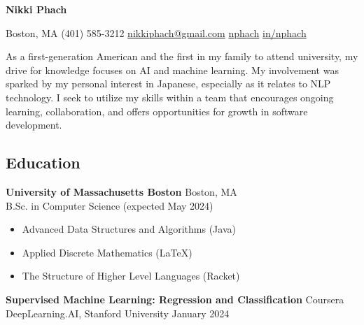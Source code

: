 \documentclass[11pt, letterpaper]{article}
\begin{document}
\begin{center}
    {\huge \textbf{Nikki Phach}}
    \vspace{5mm}
    
    \begin{footnotesize}
    \mbox{} \xdotfill[.5ex]{.4pt} \enspace
    {\color{accent} }
    \enspace Boston, MA \quad\textbar\quad
    {\color{accent} }
    \enspace (401) 585-3212 \quad\textbar\quad
    \href{mailto:nikkiphach@gmail.com}{{\color{accent} } \enspace nikkiphach@gmail.com} \quad\textbar\quad
    \href{https://github.com/nphach}{{\color{accent} } \enspace nphach}
    \quad\textbar\quad
    \href{https://www.linkedin.com/in/nikki-phach-a269172aa/}{{\color{accent} } \enspace in/nphach}
    \enspace \xdotfill[.5ex]{.4pt}
    \end{footnotesize}
    
\end{center}

    \noindent As a first-generation American and the first in my family to attend university, my drive for knowledge focuses on AI and machine learning. My involvement was sparked by my personal interest in Japanese, especially as it relates to NLP technology. I seek to utilize my skills within a team that encourages ongoing learning, collaboration, and offers opportunities for growth in software development.

\vspace{-3mm}
\subsection*{\color{accent} Education \xdotfill[.5ex]{.4pt}}
\textbf{University of Massachusetts Boston} \hfill Boston, MA \\
B.Sc. in Computer Science \hfill (expected May 2024)
\begin{itemize}[noitemsep]
\item Advanced Data Structures and Algorithms (Java)
\item Applied Discrete Mathematics (\LaTeX)
\item The Structure of Higher Level Languages (Racket)
\end{itemize}
\textbf{Supervised Machine Learning: Regression and Classification} \hfill Coursera \\
DeepLearning.AI, Stanford University \hfill January 2024

\vspace{-3mm}
\end{document}
